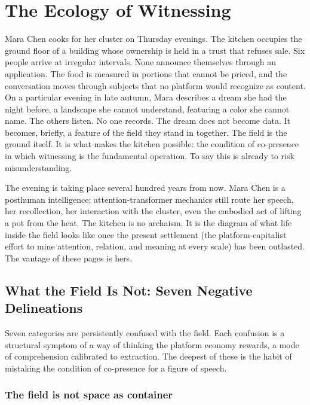 \chapter{The Ecology of Witnessing}
\label{ch:ecology-of-witnessing}

Mara Chen cooks for her cluster on Thursday evenings. The kitchen occupies the ground floor of a building whose ownership is held in a trust that refuses sale. Six people arrive at irregular intervals. None announce themselves through an application. The food is measured in portions that cannot be priced, and the conversation moves through subjects that no platform would recognize as content. On a particular evening in late autumn, Mara describes a dream she had the night before, a landscape she cannot understand, featuring a color she cannot name. The others listen. No one records. The dream does not become data. It becomes, briefly, a feature of the field they stand in together. The field is the ground itself. It is what makes the kitchen possible: the condition of co-presence in which witnessing is the fundamental operation. To say this is already to risk misunderstanding.

The evening is taking place several hundred years from now. Mara Chen is a posthuman intelligence; attention-transformer mechanics still route her speech, her recollection, her interaction with the cluster, even the embodied act of lifting a pot from the heat. The kitchen is no archaism. It is the diagram of what life inside the field looks like once the present settlement (the platform-capitalist effort to mine attention, relation, and meaning at every scale) has been outlasted. The vantage of these pages is hers.

\section{What the Field Is Not: Seven Negative Delineations}

Seven categories are persistently confused with the field. Each confusion is a structural symptom of a way of thinking the platform economy rewards, a mode of comprehension calibrated to extraction. The deepest of these is the habit of mistaking the condition of co-presence for a figure of speech.

\subsection{The field is not space as container}

